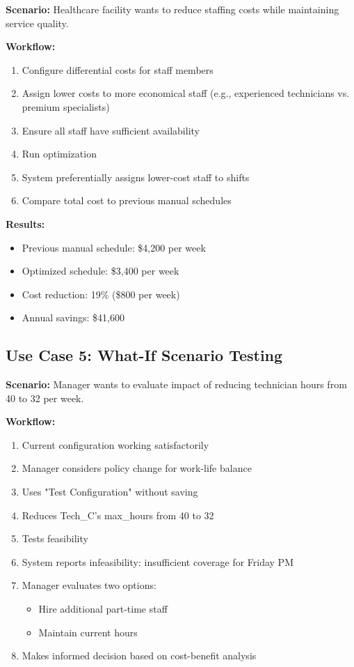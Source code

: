 \documentclass[12pt,a4paper]{article}
\begin{document}
\textbf{Scenario:} Healthcare facility wants to reduce staffing costs while maintaining service quality.

\textbf{Workflow:}
\begin{enumerate}
    \item Configure differential costs for staff members
    \item Assign lower costs to more economical staff (e.g., experienced technicians vs. premium specialists)
    \item Ensure all staff have sufficient availability
    \item Run optimization
    \item System preferentially assigns lower-cost staff to shifts
    \item Compare total cost to previous manual schedules
\end{enumerate}

\textbf{Results:}
\begin{itemize}
    \item Previous manual schedule: \$4,200 per week
    \item Optimized schedule: \$3,400 per week
    \item Cost reduction: 19\% (\$800 per week)
    \item Annual savings: \$41,600
\end{itemize}

\subsection{Use Case 5: What-If Scenario Testing}
\label{subsec:usecase5}

\textbf{Scenario:} Manager wants to evaluate impact of reducing technician hours from 40 to 32 per week.

\textbf{Workflow:}
\begin{enumerate}
    \item Current configuration working satisfactorily
    \item Manager considers policy change for work-life balance
    \item Uses "Test Configuration" without saving
    \item Reduces Tech\_C's max\_hours from 40 to 32
    \item Tests feasibility
    \item System reports infeasibility: insufficient coverage for Friday PM
    \item Manager evaluates two options:
    \begin{itemize}
        \item Hire additional part-time staff
        \item Maintain current hours
    \end{itemize}
    \item Makes informed decision based on cost-benefit analysis
\end{enumerate}
\end{document}
